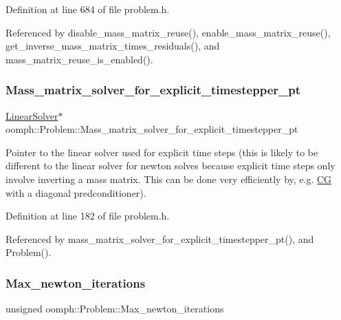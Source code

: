 Definition at line 684 of file problem.\+h.



Referenced by disable\+\_\+mass\+\_\+matrix\+\_\+reuse(), enable\+\_\+mass\+\_\+matrix\+\_\+reuse(), get\+\_\+inverse\+\_\+mass\+\_\+matrix\+\_\+times\+\_\+residuals(), and mass\+\_\+matrix\+\_\+reuse\+\_\+is\+\_\+enabled().

\mbox{\label{classoomph_1_1Problem_ad4b9d15269f624044d1730957b0a8c19}} 
\subsubsection{\texorpdfstring{Mass\+\_\+matrix\+\_\+solver\+\_\+for\+\_\+explicit\+\_\+timestepper\+\_\+pt}{Mass\_matrix\_solver\_for\_explicit\_timestepper\_pt}}
{\footnotesize\ttfamily \hyperlink{classoomph_1_1LinearSolver}{Linear\+Solver}$\ast$ oomph\+::\+Problem\+::\+Mass\+\_\+matrix\+\_\+solver\+\_\+for\+\_\+explicit\+\_\+timestepper\+\_\+pt\hspace{0.3cm}{\ttfamily [private]}}

Pointer to the linear solver used for explicit time steps (this is likely to be different to the linear solver for newton solves because explicit time steps only involve inverting a mass matrix. This can be done very efficiently by, e.\+g. \hyperlink{classoomph_1_1CG}{CG} with a diagonal predconditioner). 

Definition at line 182 of file problem.\+h.



Referenced by mass\+\_\+matrix\+\_\+solver\+\_\+for\+\_\+explicit\+\_\+timestepper\+\_\+pt(), and Problem().

\mbox{\label{classoomph_1_1Problem_a52a58a98c3e2e7dbaefcfb1ee7830c35}} 
\subsubsection{\texorpdfstring{Max\+\_\+newton\+\_\+iterations}{Max\_newton\_iterations}}
{\footnotesize\ttfamily unsigned oomph\+::\+Problem\+::\+Max\+\_\+newton\+\_\+iterations\hspace{0.3cm}{\ttfamily [protected]}}



